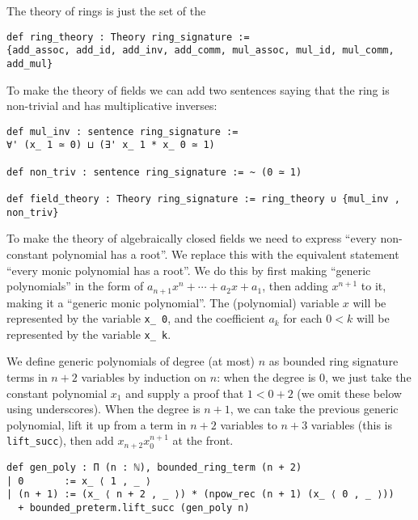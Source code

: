 \begin{dfn}
  The theory of rings is just the set of the
\begin{lstlisting}
def ring_theory : Theory ring_signature :=
{add_assoc, add_id, add_inv, add_comm, mul_assoc, mul_id, mul_comm, add_mul}\end{lstlisting}

  To make the theory of fields we can add two sentences saying that
  the ring is non-trivial and has multiplicative inverses:
  \begin{lstlisting}
def mul_inv : sentence ring_signature :=
∀' (x_ 1 ≃ 0) ⊔ (∃' x_ 1 * x_ 0 ≃ 1)

def non_triv : sentence ring_signature := ~ (0 ≃ 1)

def field_theory : Theory ring_signature := ring_theory ∪ {mul_inv , non_triv} \end{lstlisting}

  To make the theory of algebraically closed fields we need to express
  ``every non-constant polynomial has a root''.
  We replace this with the equivalent statement ``every monic polynomial has a root''.
  We do this by first making ``generic polynomials''
  in the form of $a_{n+1}x^{n} + \cdots + a_{2}x + a_{1}$,
  then adding $x^{n+1}$ to it, making it a ``generic monic polynomial''.
  The (polynomial) variable $x$ will be represented by the variable \texttt{x\_ 0},
  and the coefficient $a_{k}$ for each $0 < k$ will be represented by the variable
  \texttt{x\_ k}.

  We define generic polynomials of degree (at most) $n$ as bounded ring signature terms
  in $n + 2$ variables by induction on $n$:
  when the degree is $0$, we just take the constant polynomial $x_{1}$
  and supply a proof that $1 < 0 + 2$ (we omit these below using underscores).
  When the degree is $n + 1$, we can take the previous generic polynomial,
  lift it up from a term in $n + 2$ variables to $n + 3$ variables
  (this is \texttt{lift\_succ}),
  then add $x_{n + 2} x_{0}^{n+1}$ at the front.

  \begin{lstlisting}
def gen_poly : Π (n : ℕ), bounded_ring_term (n + 2)
| 0       := x_ ⟨ 1 , _ ⟩
| (n + 1) := (x_ ⟨ n + 2 , _ ⟩) * (npow_rec (n + 1) (x_ ⟨ 0 , _ ⟩))
  + bounded_preterm.lift_succ (gen_poly n)
\end{lstlisting}


\end{dfn}
